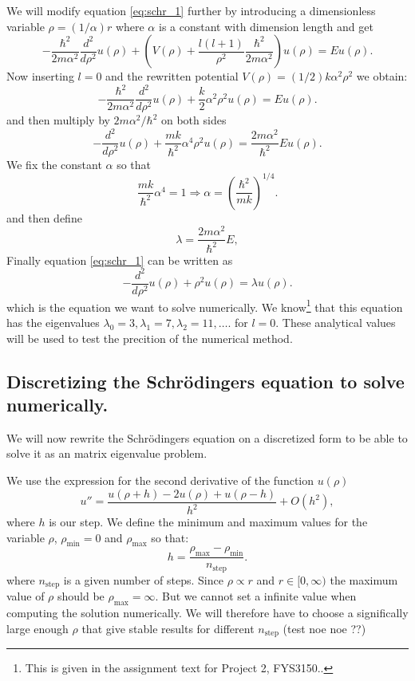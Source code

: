 \documentclass[11pt,a4wide]{article}
\begin{document}
We will modify equation \ref{eq:schr_1} further by introducing a dimensionless variable $\rho = (1/\alpha) r$ where $\alpha$ is a constant with dimension length and get
% 
\[
  -\frac{\hbar^2}{2 m \alpha^2} \frac{d^2}{d\rho^2} u(\rho) 
       + \left ( V(\rho) + \frac{l (l + 1)}{\rho^2}
         \frac{\hbar^2}{2 m\alpha^2} \right ) u(\rho)  = E u(\rho) .
\]
%
Now inserting $l=0$ and the rewritten potential $V(\rho) = (1/2) k \alpha^2\rho^2$ we obtain:
\[
  -\frac{\hbar^2}{2 m \alpha^2} \frac{d^2}{d\rho^2} u(\rho) 
       + \frac{k}{2} \alpha^2\rho^2u(\rho)  = E u(\rho) .
\]
and then multiply by $2m\alpha^2/\hbar^2$ on both sides
\[
  -\frac{d^2}{d\rho^2} u(\rho) 
       + \frac{mk}{\hbar^2} \alpha^4\rho^2u(\rho)  = \frac{2m\alpha^2}{\hbar^2}E u(\rho) .
\]
We fix the constant $\alpha$ so that
\[
\frac{mk}{\hbar^2} \alpha^4 = 1 \Rightarrow \alpha = \left(\frac{\hbar^2}{mk}\right)^{1/4}.
\]
and then define 
\[
\lambda = \frac{2m\alpha^2}{\hbar^2}E,
\]
Finally equation \ref{eq:schr_1} can be written as
\begin{equation}
  -\frac{d^2}{d\rho^2} u(\rho) + \rho^2u(\rho)  = \lambda u(\rho) .
  \label{eq: sch_1D_final}
\end{equation}
which is the equation we want to solve numerically. We know\footnote{This is given in the assignment text for Project 2, FYS3150..} that this equation has the eigenvalues $\lambda_0=3,\lambda_1=7,\lambda_2=11,\dots .$ for $l=0$. These analytical values will be used to test the precition of the numerical method.

\subsection{Discretizing the Schr\"odingers equation to solve numerically.}
We will now rewrite the Schr\"odingers equation on a discretized form to be able to solve it as an matrix eigenvalue problem.

We use the expression for the second derivative of the function $u(\rho)$
\begin{equation}
    u''=\frac{u(\rho+h) -2u(\rho) +u(\rho-h)}{h^2} +O(h^2),
    \label{eq:diffoperation}
\end{equation} 
where $h$ is our step. We define the minimum and maximum values for the variable $\rho$,
$\rho_{\mathrm{min}}=0$  and $\rho_{\mathrm{max}}$ so that:
\[
  h=\frac{\rho_{\mathrm{max}}-\rho_{\mathrm{min}} }{n_{\mathrm{step}}}.
\]
where $n_{\mathrm{step}}$ is a given number of steps. Since $\rho \propto r$ and $r\in [0,\infty)$ the maximum value of $\rho$ should be $\rho_{\mathrm{max}}=\infty$. But we cannot set a infinite value when computing the solution numerically. We will therefore have to choose a significally large enough $\rho$ that give stable results for different $n_{\mathrm{step}}$ (test noe noe ??)
\end{document}
